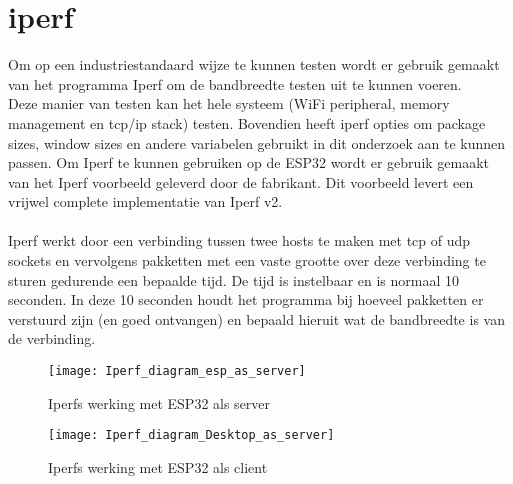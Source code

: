 \documentclass[../DCM2_Verslag.tex]{subfiles}
\begin{document}
\section{iperf}
Om op een industriestandaard wijze te kunnen testen wordt er gebruik gemaakt van het programma Iperf om de bandbreedte testen uit te kunnen voeren.\\
Deze manier van testen kan het hele systeem (WiFi peripheral, memory management en tcp/ip stack) testen. Bovendien heeft iperf opties om package sizes, window sizes en andere variabelen gebruikt in dit onderzoek aan te kunnen passen. Om Iperf te kunnen gebruiken op de ESP32 wordt er gebruik gemaakt van het Iperf voorbeeld geleverd door de fabrikant. Dit voorbeeld levert een vrijwel complete implementatie van Iperf v2.\\\\
Iperf werkt door een verbinding tussen twee hosts te maken met tcp of udp sockets en vervolgens pakketten met een vaste grootte over deze verbinding te sturen gedurende een bepaalde tijd. De tijd is instelbaar en is normaal 10 seconden. In deze 10 seconden houdt het programma bij hoeveel pakketten er verstuurd zijn (en goed ontvangen) en bepaald hieruit wat de bandbreedte is van de verbinding.\\
\begin{figure}[h]
\texttt{[image: Iperf\_diagram\_esp\_as\_server]}
\caption{Iperfs werking met ESP32 als server}
\end{figure}
\begin{figure}[h]
\texttt{[image: Iperf\_diagram\_Desktop\_as\_server]}
\caption{Iperfs werking met ESP32 als client}
\end{figure}
\end{document}
